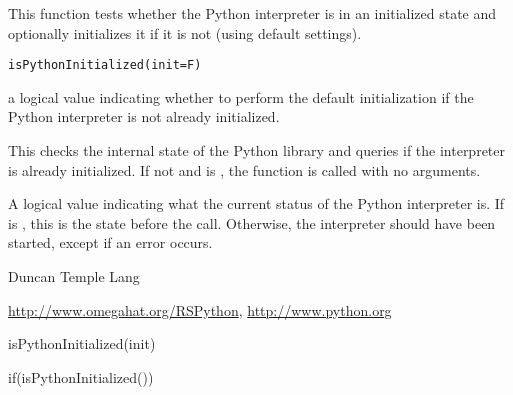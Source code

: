\begin{Description}\relax
This function tests whether the Python interpreter is in an initialized state
and optionally initializes it if it is not (using default settings).\end{Description}
\begin{Usage}
\begin{verbatim}
isPythonInitialized(init=F)
\end{verbatim}
\end{Usage}
\begin{Arguments}
\begin{ldescription}
\item[\code{init}] a logical value indicating whether to perform the default initialization
if the Python interpreter is not already initialized.

\end{ldescription}
\end{Arguments}
\begin{Details}\relax
This checks the internal state of the Python library and queries if the
interpreter is already initialized. If not and  is ,
the function  is called with no arguments.\end{Details}
\begin{Value}
A logical value indicating what the current status of the Python interpreter
is. If  is , this is the state before the call.
Otherwise, the interpreter should have been started, except if an error occurs.\end{Value}
\begin{Author}\relax
Duncan Temple Lang\end{Author}
\begin{References}\relax
\url{http://www.omegahat.org/RSPython},
\url{http://www.python.org}\end{References}
\begin{Examples}
\begin{ExampleCode}
 isPythonInitialized(init)

 if(isPythonInitialized())
\end{ExampleCode}
\end{Examples}

